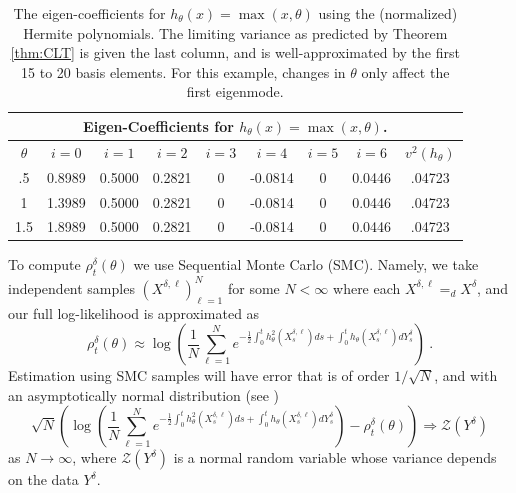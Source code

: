 \documentclass{article}
\begin{document}
\begin{table}
\centering
\begin{tabular}{|c|cc cc cc c |c|}
\multicolumn{9}{c}{Eigen-Coefficients for $h_{\theta}(x) = \max(x,\theta)$.}\\
\hline
$\theta$&$i=0$&$i=1$&$i=2$&$i=3$&$i=4$&$i=5$&$i=6$&$v^2(h_\theta)$\\
\hline
.5&0.8989&    0.5000 &   0.2821  &       0&   -0.0814    &     0  &  0.0446& .04723\\
1&1.3989 &   0.5000 &   0.2821  &       0 &  -0.0814   &      0   & 0.0446 & .04723\\
1.5&1.8989&    0.5000&    0.2821  &       0&   -0.0814&         0 &   0.0446  & .04723\\
\hline
\end{tabular}
\vspace{.2cm}
\caption{The eigen-coefficients for $h_{\theta}(x) = \max(x,\theta)$ using the (normalized) Hermite polynomials. The limiting variance as predicted by Theorem \ref{thm:CLT} is given the last column, and is well-approximated by the first 15 to 20 basis elements. For this example, changes in $\theta$ only affect the first eigenmode.}
\label{T:eigenCoefficients}
\end{table}

To compute ${\rho}^{\delta}_{t}(\theta)$ we use Sequential Monte Carlo (SMC). Namely,
 we take independent samples $(X^{\delta,\ell})_{\ell=1}^N$ for some $N<\infty$ where each $X^{\delta,\ell}=_dX^\delta$, and our full log-likelihood is approximated as
\[\rho_t^\delta(\theta)\approx  \log\left(\frac 1N \sum_{\ell=1}^Ne^{-\frac 12\int_0^th_{\theta}^2(X_s^{\delta,\ell})ds+\int_0^th_{\theta}(X_s^{\delta,\ell})dY_s^\delta}\right)\ .\]
Estimation using SMC samples will have error that is of order $1/\sqrt N$, and with an asymptotically normal distribution (see \cite{delMoral2001,CMR2005})
\[\sqrt N\left(\log\left(\frac 1N \sum_{\ell=1}^Ne^{-\frac 12\int_0^th_{\theta}^2(X_s^{\delta,\ell})ds+\int_0^th_{\theta}(X_s^{\delta,\ell})dY_s^\delta}\right)-\rho_t^\delta(\theta) \right)\Rightarrow \mathcal Z(Y^\delta)\]
as $N\rightarrow \infty$, where $\mathcal Z(Y^\delta)$ is a normal random variable whose variance depends on the data $Y^\delta$.
\end{document}
